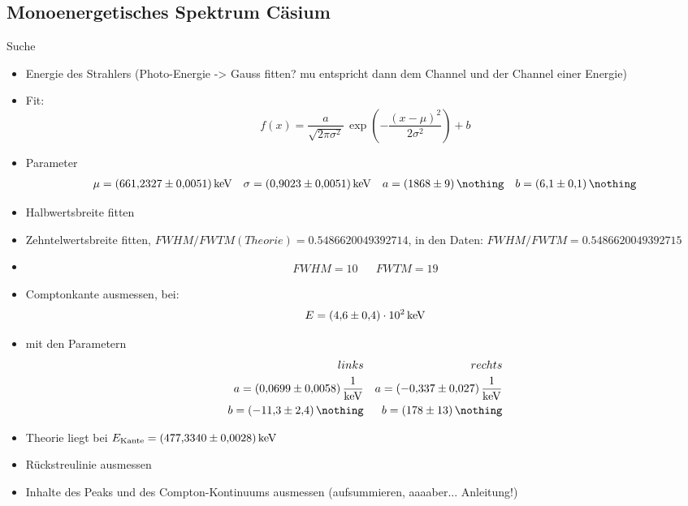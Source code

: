 \FloatBarrier
\subsection{Monoenergetisches Spektrum Cäsium}
Suche
\begin{itemize}
	\item Energie des Strahlers (Photo-Energie -> Gauss fitten? mu entspricht dann dem Channel und der Channel einer Energie)
	\item Fit:
	\begin{equation*}
		f(x) = \frac{a}{\sqrt{2 \pi \sigma^2}} \, \exp{\left( - \frac{(x-\mu)^2}{2 \sigma^2} \right)} + b
	\end{equation*}
	\item Parameter
	\begin{align*}
		\mu = \SI{661.2327 (51)}{\kilo \electronvolt} && \sigma = \SI{0.9023 (51)}{\kilo \electronvolt} && a = \SI{1868 (9)}{\nothing} && b = \SI{6.1 (1)}{\nothing}
	\end{align*}
	\item Halbwertsbreite fitten
	\item Zehntelwertsbreite fitten, $FWHM/FWTM(Theorie) = 0.5486620049392714$, in den Daten: $FWHM/FWTM = 0.5486620049392715$
	\item
	\begin{align*}
		FWHM = 10 && FWTM = 19
	\end{align*}
	\item Comptonkante ausmessen, bei:
	\begin{align*}
		E = \SI{4.6 (4)e+02}{\kilo \electronvolt}
	\end{align*}
	\item
	mit den Parametern
	\begin{align*}
		links   && rechts \\
		a = \SI{0.0699 (58)}{\frac{1}{\kilo \electronvolt}} && a = \SI{ -0.337 (27)}{\frac{1}{\kilo \electronvolt}} \\
		b = \SI{ -11.3 (24)}{\nothing} 						&& b = \SI{ 178 (13)}{\nothing} \\
	\end{align*}
	\item Theorie liegt bei $E_{\text{Kante}} = \SI{477.3340 (28)}{\kilo \electronvolt}$
	\item Rückstreulinie ausmessen
	\item Inhalte des Peaks und des Compton-Kontinuums ausmessen (aufsummieren, aaaaber... Anleitung!)
\end{itemize}
